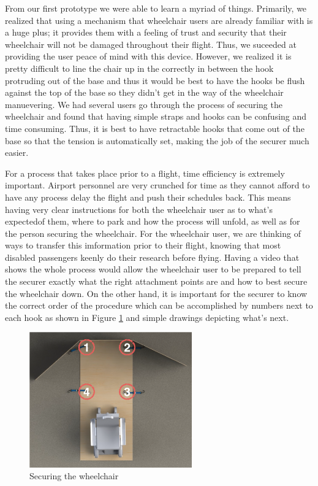 From our first prototype we were able to learn a myriad of things. Primarily, we realized that using a mechanism that wheelchair users are already familiar with is a huge plus; it provides them with a feeling of trust and security that their wheelchair will not be damaged throughout their flight. Thus, we suceeded at providing the user peace of mind with this device. However, we realized it is pretty difficult to line the chair up in the correctly in between the hook protruding out of the base and thus it would be best to have the hooks be flush against the top of the base so they didn't get in the way of the wheelchair manuevering.
We had several users go through the process of securing the wheelchair and found that having simple straps and hooks can be confusing and time consuming. Thus, it is best to have retractable hooks that come out of the base so that the tension is automatically set, making the job of the securer much easier. 

For a process that takes place prior to a flight, time efficiency is extremely important. Airport personnel are very crunched for time as they cannot afford to have any process delay the flight and push their schedules back. This means having very clear instructions for both the wheelchair user as to what's expectedof them, where to park and how the process will unfold, as well as for the person securing the wheelchair. For the wheelchair user, we are thinking of ways to transfer this imformation prior to their flight, knowing that most disabled passengers keenly do their research before flying. Having a video that shows the whole process would allow the wheelchair user to be prepared to tell the securer exactly what the right attachment points are and how to best secure the wheelchair down. On the other hand, it is important for the securer to know the correct order of the procedure which can be accomplished by numbers next to each hook as shown in Figure \ref{fig:instructionsstorage.png} and simple drawings depicting what's next. 

\begin{figure}[h]
  \centering
     \includegraphics[width=7cm]{images/instructionsstorage.png}
   \caption{Securing the wheelchair}
  \label{fig:instructionsstorage.png}
\end{figure}

